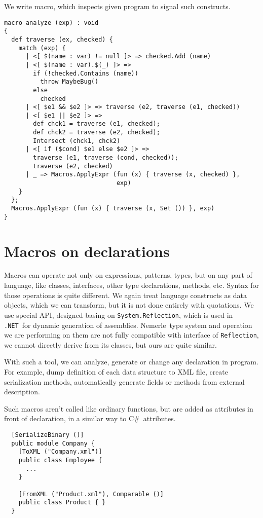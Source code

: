 \documentclass{llncs}
\newcommand{\net}[0]{{\tt .NET}}
\newcommand{\nem}[0]{Nemerle}
\newcommand{\cs}[0]{C\#}
\begin{document}
We write macro, which inspects given program to signal such constructs.
\begin{verbatim}
macro analyze (exp) : void 
{
  def traverse (ex, checked) {
    match (exp) {
      | <[ $(name : var) != null ]> => checked.Add (name)
      | <[ $(name : var).$(_) ]> => 
        if (!checked.Contains (name)) 
          throw MaybeBug() 
        else 
          checked
      | <[ $e1 && $e2 ]> => traverse (e2, traverse (e1, checked))
      | <[ $e1 || $e2 ]> => 
        def chck1 = traverse (e1, checked);
        def chck2 = traverse (e2, checked);
        Intersect (chck1, chck2)
      | <[ if ($cond) $e1 else $e2 ]> =>
        traverse (e1, traverse (cond, checked));
        traverse (e2, checked)
      | _ => Macros.ApplyExpr (fun (x) { traverse (x, checked) }, 
                               exp)
    }
  };
  Macros.ApplyExpr (fun (x) { traverse (x, Set ()) }, exp)
}
\end{verbatim} %

\section{Macros on declarations} \label{Declarations}
Macros can operate not only on expressions, patterns, types, but on
any part of language, like classes, interfaces, other type declarations,
methods, etc. Syntax for those operations is quite different. We again
treat language constructs as data objects, which we can transform, but
it is not done entirely with quotations. We use special API, designed 
basing on \verb,System.Reflection,, which is used in \net\ for dynamic
generation of assemblies. \nem\ type system and operation we are performing
on them are not fully compatible with interface of \verb,Reflection,,
we cannot directly derive from its classes, but ours are quite similar.

With such a tool, we can analyze, generate or change any declaration
in program. For example, dump definition of each data structure 
to XML file, create serialization methods, automatically
generate fields or methods from external description.

Such macros aren't called like ordinary functions, but are added as
attributes in front of declaration, in a similar way to \cs\ attributes.

\begin{verbatim}
  [SerializeBinary ()] 
  public module Company {
    [ToXML ("Company.xml")] 
    public class Employee {
      ...
    }

    [FromXML ("Product.xml"), Comparable ()] 
    public class Product { }
  }
\end{verbatim}
\end{document}
